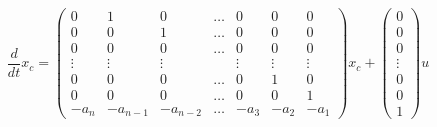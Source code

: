         \begin{equation}
            \frac{d}{dt} x_c =
            \begin{pmatrix}
            0 & 1 & 0 & \dots & 0 & 0 & 0 \\
            0 & 0 & 1 & \dots & 0 & 0 & 0 \\
            0 & 0 & 0 & \dots & 0 & 0 & 0 \\
            \vdots & \vdots & \vdots & & \vdots & \vdots & \vdots \\
            0 & 0 & 0 & \dots & 0 & 1 & 0 \\
            0 & 0 & 0 & \dots & 0 & 0 & 1 \\
            -a_{n} & -a_{n-1} & -a_{n-2} & \dots & -a_{3} & -a_{2} & -a_{1}
            \end{pmatrix} x_c +
            \begin{pmatrix}
            0 \\
            0 \\
            0 \\
            \vdots \\
            0 \\
            0 \\
            1
            \end{pmatrix} u
        \end{equation}

